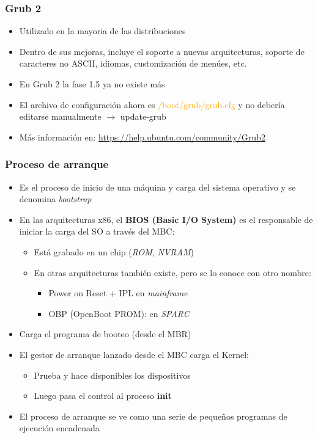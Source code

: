 \begin{frame}
	\frametitle{Grub 2}
	\begin{itemize}
		\item Utilizado en la mayoria de las distribuciones
		\item Dentro de sus mejoras, incluye el soporte a nuevas arquitecturas, soporte de caracteres no ASCII, idiomas, customización de menúes, etc.
		\item En Grub 2 la fase 1.5 ya no existe más
		\item El archivo de configuración ahora es \textcolor{orange}{/boot/grub/grub.cfg} y no debería editarse manualmente $\rightarrow$ update-grub
		\item Más información en: \url{https://help.ubuntu.com/community/Grub2}
	\end{itemize}
\end{frame}

\begin{frame}
	\frametitle{Proceso de arranque}
	\begin{itemize}
		\item Es el proceso de inicio de una máquina y carga del sistema operativo y se denomina \textit{bootstrap}
		\item En las arquitecturas x86, el \textbf{BIOS (Basic I/O System)} es el responsable de iniciar la carga del SO a través del MBC:
		\begin{itemize}
			\item Está grabado en un chip (\emph{ROM}, \emph{NVRAM})
			\item En otras arquitecturas también existe, pero se lo conoce con otro nombre:
			\begin{itemize}
				\item Power on Reset + IPL en \textit{mainframe}
				\item OBP (OpenBoot PROM): en \textit{SPARC}
			\end{itemize}
		\end{itemize}
		\item Carga el programa de booteo (desde el MBR)
		\item El gestor de arranque lanzado desde el MBC carga el Kernel:
		\begin{itemize}
			\item Prueba y hace disponibles los dispositivos
			\item Luego pasa el control al proceso \textbf{init}
		\end{itemize}
		\item El proceso de arranque se ve como una serie de pequeños programas de ejecución encadenada
	\end{itemize}
\end{frame}

